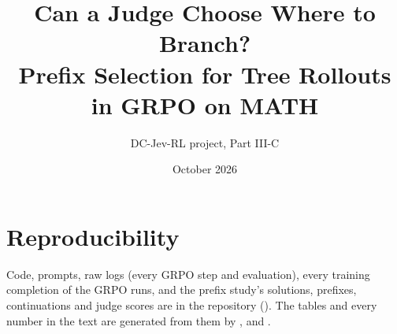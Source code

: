 \documentclass[11pt]{article}
\title{Can a Judge Choose Where to Branch?\\Prefix Selection for Tree Rollouts in GRPO on MATH}
\author{DC-Jev-RL project, Part III-C}
\date{October 2026}
\begin{document}
\maketitle

\begin{abstract}

\end{abstract}







\section*{Reproducibility}
Code, prompts, raw logs (every GRPO step and evaluation), every training completion of the GRPO runs, and the prefix
study's solutions, prefixes, continuations and judge scores are in the repository (). The tables and every number in the text are
generated from them by ,  and
.



\end{document}
